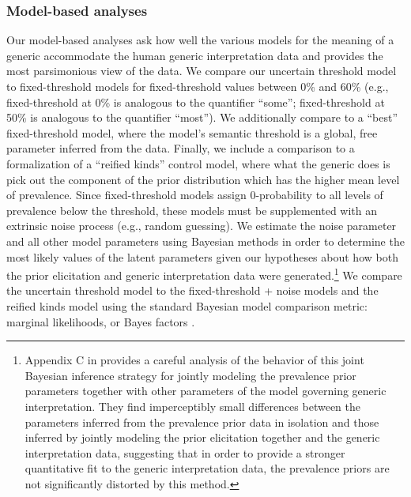\documentclass[floatsintext,man]{apa6}
\let\rmarkdownfootnote\footnote%
\def\footnote{\protect\rmarkdownfootnote}
\newcommand{\ndg}[1]{{\textcolor{Green}{[ndg: #1]}}}
\begin{document}
\hypertarget{model-based-analyses}{%
\subsubsection{Model-based analyses}\label{model-based-analyses}}

Our model-based analyses ask how well the various models for the meaning of a generic accommodate the human generic interpretation data and provides the most parsimonious view of the data.
We compare our uncertain threshold model to fixed-threshold models for fixed-threshold values between 0\% and 60\% (e.g., fixed-threshold at 0\% is analogous to the quantifier ``some''; fixed-threshold at 50\% is analogous to the quantifier ``most''). 
We additionally compare to a ``best'' fixed-threshold model, where the model's semantic threshold is a global, free parameter inferred from the data. 
Finally, we include a comparison to a formalization of a ``reified kinds'' control model, where what the generic does is pick out the component of the prior distribution which has the higher mean level of prevalence. 
Since fixed-threshold models assign 0-probability to all levels of prevalence below the threshold, these models must be supplemented with an extrinsic noise process (e.g., random guessing).
We estimate the noise parameter and all other model parameters using Bayesian methods in order to determine the most likely values of the latent parameters given our hypotheses about how both the prior elicitation and generic interpretation data were generated.\footnote{Appendix C in  provides a careful analysis of the behavior of this joint Bayesian inference strategy for jointly modeling the prevalence prior parameters together with other parameters of the model governing generic interpretation. They find imperceptibly small differences between the parameters inferred from the prevalence prior data in isolation and those inferred by jointly modeling the prior elicitation together and the generic interpretation data, suggesting that in order to provide a stronger quantitative fit to the generic interpretation data, the prevalence priors are not significantly distorted by this method.}
We compare the uncertain threshold model to the fixed-threshold + noise models and the reified kinds model using the standard Bayesian model comparison metric: marginal likelihoods, or Bayes factors \cite{LeeWagenmakers2014}.
\end{document}
